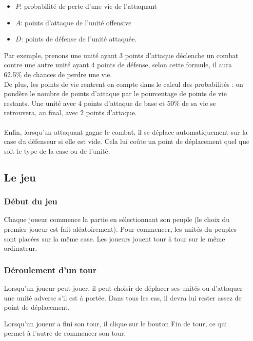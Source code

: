 \bigskip
\begin{itemize}
  \item \ensuremath{P}: probabilité de perte d'une vie de l'attaquant
  \item \ensuremath{A}: points d'attaque de l'unité offensive
  \item \ensuremath{D}: points de défense de l'unité attaquée.
\end{itemize}
\bigskip

Par exemple, prenons une unité ayant 3 points d'attaque déclenche un combat contre une autre unité ayant 4 points de défense, selon cette formule, il aura 62.5\% de chances de perdre une vie.\\

De plus, les points de vie rentrent en compte dans le calcul des probabilités : on pondère le nombre de points d'attaque par le pourcentage de points de vie restants. Une unité avec 4 points d'attaque de base et 50\% de sa vie se retrouvera, au final, avec 2 points d'attaque.\\\\
Enfin, lorsqu'un attaquant gagne le combat, il se déplace automatiquement sur la case du défenseur si elle est vide. Cela lui coûte un point de déplacement quel que soit le type de la case ou de l'unité.

\subsection{Le jeu}
\subsubsection{Début du jeu}
Chaque joueur commence la partie en sélectionnant son peuple (le choix du premier joueur est fait aléatoirement). Pour commencer, les unités du peuples sont placées sur la même case. Les joueurs jouent tour à tour sur le même ordinateur.
\subsubsection{Déroulement d'un tour}
Lorsqu'un joueur peut jouer, il peut choisir de déplacer ses unités ou d'attaquer une unité adverse s'il est à portée. Dans tous les cas, il devra lui rester assez de point de déplacement.

Lorsqu'un joueur a fini son tour, il clique sur le bouton Fin de tour, ce qui permet à l'autre de commencer son tour.
